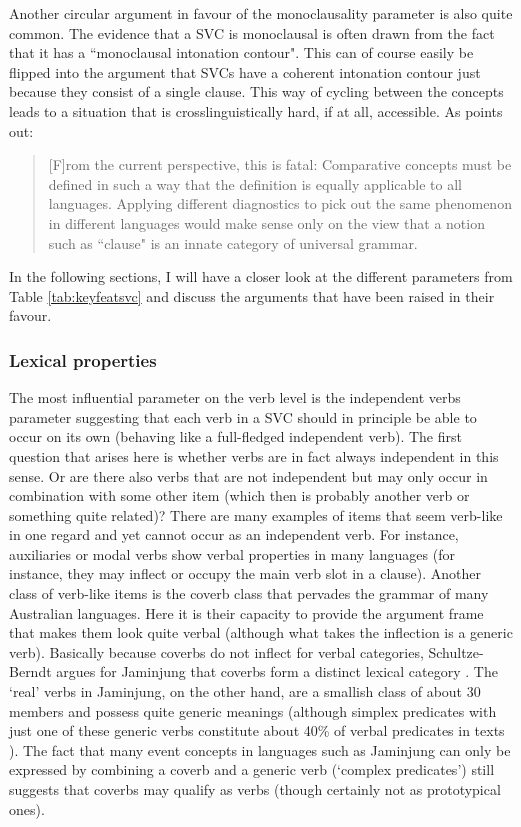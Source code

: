 Another circular argument in favour of the monoclausality parameter is also quite common. The evidence that a SVC is monoclausal is often drawn from the fact that it has a ``monoclausal intonation contour". This can of course easily be flipped into the argument that SVCs have a coherent intonation contour just because they consist of a single clause. This way of cycling between the concepts leads to a situation that is crosslinguistically hard, if at all, accessible. As \citet[299]{haspelmath2016serial} points out: 
\begin{quote}[F]rom the current perspective, this is fatal: Comparative concepts must be defined in such a way that the definition is equally applicable to all languages. Applying different diagnostics to pick out the same phenomenon in different languages would make sense only on the view that a notion such as ``clause" is an innate category of universal grammar.\end{quote}

In the following sections, I will have a closer look at the different parameters from Table \ref{tab:keyfeatsvc} and discuss the arguments that have been raised in their favour.

\subsubsection{Lexical properties}\label{sec:lexprop}

The most influential parameter on the verb level is the independent verbs parameter suggesting that each verb in a SVC should in principle be able to occur on its own (behaving like a full-fledged independent verb). The first question that arises here is whether verbs are in fact always independent in this sense. Or are there also verbs that are not independent but may only occur in combination with some other item (which then is probably another verb or something quite related)? There are many examples of items that seem verb-like in one regard and yet cannot occur as an independent verb. For instance, auxiliaries or modal verbs show verbal properties in many languages (for instance, they may inflect or occupy the main verb slot in a clause). Another class of verb-like items is the coverb class that pervades the grammar of many Australian languages. Here it is their capacity to provide the argument frame that makes them look quite verbal (although what takes the inflection is a generic verb). Basically because coverbs do not inflect for verbal categories, Schultze-Berndt argues for Jaminjung that coverbs form a distinct lexical category \citep[71]{schultze2000simple}. The `real' verbs in Jaminjung, on the other hand, are a smallish class of about 30 members and possess quite generic meanings (although simplex predicates with just one of these generic verbs constitute about 40\% of verbal predicates in texts \citealt[118]{schultze2000simple}). The fact that many event concepts in languages such as Jaminjung can only be expressed by combining a coverb and a generic verb (`complex predicates') still suggests that coverbs may qualify as verbs (though certainly not as prototypical ones).

